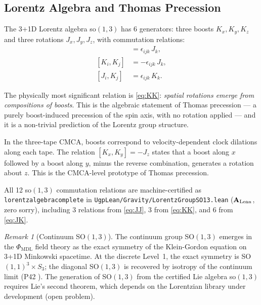 \documentclass[11pt]{article}
\theoremstyle{remark}
\newtheorem{remark}[theorem]{Remark}
\newcommand{\PHIMDL}{\Phi_{\mathrm{MDL}}}
\newcommand{\lean}[1]{%
  \penalty-100
  \begingroup\def\_{\textunderscore\allowbreak}\texttt{#1}\endgroup}
\newcommand{\CatAL}{\ensuremath{\textbf{A}_{\rm Lean}}}
\newcommand{\CMCA}{\text{CMCA}}
\begin{document}
\subsection{Lorentz Algebra and Thomas Precession}

The 3+1D Lorentz algebra so$(1,3)$ has 6 generators: three boosts
$K_x, K_y, K_z$ and three rotations $J_x, J_y, J_z$, with commutation
relations:
\begin{align}
  [J_i, J_j] &= \epsilon_{ijk}\, J_k, \label{eq:JJ} \\
  [K_i, K_j] &= -\epsilon_{ijk}\, J_k, \label{eq:KK} \\
  [J_i, K_j] &= \epsilon_{ijk}\, K_k. \label{eq:JK}
\end{align}

The physically most significant relation is \eqref{eq:KK}: \emph{spatial
rotations emerge from compositions of boosts}. This is the algebraic
statement of Thomas precession — a purely boost-induced precession of the
spin axis, with no rotation applied — and it is a non-trivial prediction of
the Lorentz group structure.

In the three-tape $\CMCA$, boosts correspond to velocity-dependent clock
dilations along each tape. The relation $[K_x, K_y] = -J_z$ states that
a boost along $x$ followed by a boost along $y$, minus the reverse
combination, generates a rotation about $z$. This is the $\CMCA$-level
prototype of Thomas precession.

All 12 so$(1,3)$ commutation relations are machine-certified as
\lean{lorentz\_algebra\_complete} in \texttt{UgpLean/Gravity/LorentzGroupSO13.lean}
($\CatAL$, zero sorry), including 3 relations from
\eqref{eq:JJ}, 3 from \eqref{eq:KK}, and 6 from \eqref{eq:JK}.

\begin{remark}[Continuum SO$(1,3)$]
The continuum group SO$(1,3)$ emerges in the $\PHIMDL$ field theory as
the exact symmetry of the Klein-Gordon equation on 3+1D Minkowski spacetime.
At the discrete Level~1, the exact symmetry is SO$(1,1)^3 \times S_3$; the
diagonal SO$(1,3)$ is recovered by isotropy of the continuum limit (P42
\cite{SpivackPhiMDLField}). The generation of SO$(1,3)$ from the certified
Lie algebra so$(1,3)$ requires Lie's second theorem, which depends on the
Lorentzian library under development (open problem).
\end{remark}

\FloatBarrier

\end{document}
